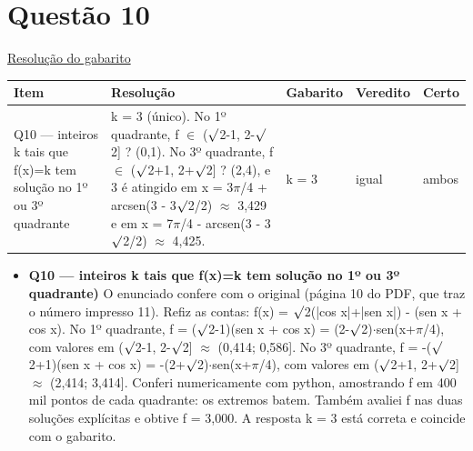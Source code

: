 \documentclass{article}%
\begin{document}
\section*{Questão 10}%
\href{https://poliedroresolve.sistemapoliedro.com.br/vestibulares/ita/2027/ita-2-fase-dia-1-20-10-2026-2-fase-dia-1/dissertativa-10-matematica-2-fase-dia-1-ita-2027}{Resolução do gabarito}\par\smallskip%
\begin{longtable}{@{}p{} p{} p{} p{} p{}@{}}\toprule Item & Resolução & Gabarito & Veredito & Certo \\ \midrule
Q10 --- inteiros k tais que f(x)=k tem solução no 1º ou 3º quadrante & k = 3 (único). No 1º quadrante, f $\in$ ($\surd$2-1, 2-$\surd$2{]} ? (0,1). No 3º quadrante, f $\in$ ($\surd$2+1, 2+$\surd$2{]} ? (2,4), e 3 é atingido em x = 3$\pi$/4 + arcsen(3 - 3$\surd$2/2) $\approx$ 3,429 e em x = 7$\pi$/4 - arcsen(3 - 3$\surd$2/2) $\approx$ 4,425. & k = 3 & igual & ambos \\
\bottomrule\end{longtable}%
\begin{itemize}%
\item%
\textbf{Q10 --- inteiros k tais que f(x)=k tem solução no 1º ou 3º quadrante)} O enunciado confere com o original (página 10 do PDF, que traz o número impresso 11). Refiz as contas: f(x) = $\surd$2(|cos x|+|sen x|) - (sen x + cos x). No 1º quadrante, f = ($\surd$2-1)(sen x + cos x) = (2-$\surd$2)$\cdot$sen(x+$\pi$/4), com valores em ($\surd$2-1, 2-$\surd$2{]} $\approx$ (0,414; 0,586{]}. No 3º quadrante, f = -($\surd$2+1)(sen x + cos x) = -(2+$\surd$2)$\cdot$sen(x+$\pi$/4), com valores em ($\surd$2+1, 2+$\surd$2{]} $\approx$ (2,414; 3,414{]}. Conferi numericamente com python, amostrando f em 400 mil pontos de cada quadrante: os extremos batem. Também avaliei f nas duas soluções explícitas e obtive f = 3,000. A resposta k = 3 está correta e coincide com o gabarito.%
\end{itemize}%
\end{document}
